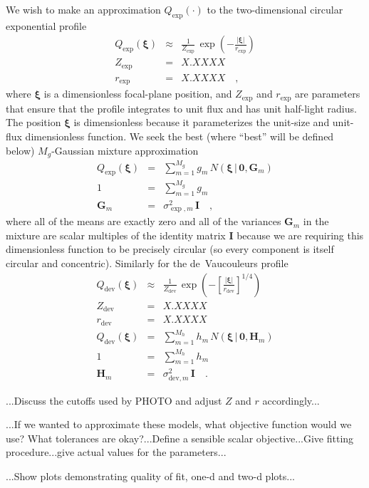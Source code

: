 \documentclass[12pt,pdftex,preprint]{aastex}
\newcommand{\tmatrix}[1]{\boldsymbol{#1}}
\newcommand{\tvector}[1]{\boldsymbol{#1}}
\newcommand{\spos}{\tvector{\xi}}
\newcommand{\Gm}{\tmatrix{G}}
\newcommand{\Hm}{\tmatrix{H}}
\newcommand{\zero}{\tmatrix{0}}
\newcommand{\identity}{\tmatrix{I}}
\newcommand{\normal}{N}
\newcommand{\given}{\,|\,}
\newcommand{\dev}{\mathrm{dev}}
\begin{document}
We wish to make an approximation $Q_{\exp}(\cdot)$ to the
two-dimensional circular exponential profile
\begin{eqnarray}\displaystyle
Q_{\exp}(\spos) &\approx& \frac{1}{Z_{\exp}}\,\exp(-\frac{|\spos|}{r_{\exp}})
\\
Z_{\exp} &=& X.XXXX
\\
r_{\exp} &=& X.XXXX
\quad ,
\end{eqnarray}
where $\spos$ is a dimensionless focal-plane position, and $Z_{\exp}$
and $r_{\exp}$ are parameters that ensure that the profile integrates
to unit flux and has unit half-light radius.  The position $\spos$ is
dimensionless because it parameterizes the unit-size and unit-flux
dimensionless function.  We seek the best (where ``best'' will be
defined below) $M_g$-Gaussian mixture approximation
\begin{eqnarray}\displaystyle
Q_{\exp}(\spos) &=& \sum_{m=1}^{M_g} g_m\,\normal(\spos\given\zero,\Gm_m)
\\
1 &=& \sum_{m=1}^{M_g} g_m
\\
\Gm_m &=& \sigma^2_{\exp,m}\,\identity
\quad ,
\end{eqnarray}
where all of the means are exactly zero and all of the variances
$\Gm_m$ in the mixture are scalar multiples of the identity matrix
$\identity$ because we are requiring this dimensionless function to be
precisely circular (so every component is itself circular and
concentric).  Similarly for the de~Vaucouleurs profile
\begin{eqnarray}\displaystyle
Q_{\dev}(\spos) &\approx& \frac{1}{Z_{\dev}}\,\exp(-\left[\frac{|\spos|}{r_{\dev}}\right]^{1/4})
\\
Z_{\dev} &=& X.XXXX
\\
r_{\dev} &=& X.XXXX
\\
Q_{\dev}(\spos) &=& \sum_{m=1}^{M_h} h_m\,\normal(\spos\given\zero,\Hm_m)
\\
1 &=& \sum_{m=1}^{M_h} h_m
\\
\Hm_m &=& \sigma^2_{\dev,m}\,\identity
\quad .
\end{eqnarray}

...Discuss the cutoffs used by PHOTO and adjust $Z$ and $r$ accordingly...

...If we wanted to approximate these models, what objective function
would we use?  What tolerances are okay?...Define a sensible scalar
objective...Give fitting procedure...give actual values for the
parameters...

...Show plots demonstrating quality of fit, one-d and two-d plots...
\end{document}
